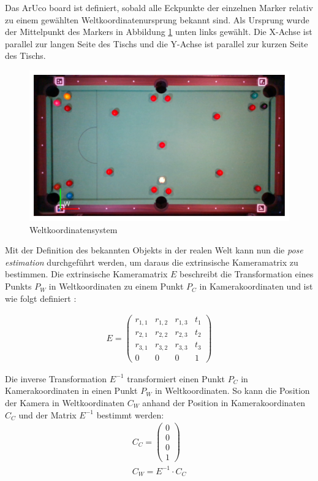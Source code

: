 Das ArUco board ist definiert, sobald alle Eckpunkte der einzelnen Marker relativ zu einem
gewählten Weltkoordinatenursprung bekannt sind. Als Ursprung wurde der Mittelpunkt des Markers
in Abbildung \ref{fig:table_world_coordinate_system} unten links gewählt.
Die X-Achse ist parallel zur langen Seite des Tischs und die Y-Achse ist parallel zur kurzen Seite des Tischs.

\begin{figure}[h!]
    \begin{center}
    \includegraphics[width=0.6\linewidth]{../common/resources/coordinate_systems/table_world_coordinate_system.png}
    \end{center}
    \caption{Weltkoordinatensystem}
    \label{fig:table_world_coordinate_system}
\end{figure}

Mit der Definition des bekannten Objekts in der realen Welt kann nun die \emph{pose estimation} durchgeführt werden,
um daraus die extrinsische Kameramatrix zu bestimmen. Die extrinsische Kameramatrix $E$ beschreibt die Transformation eines
Punkts $P_W$ in Weltkoordinaten zu einem Punkt $P_C$ in Kamerakoordinaten und ist wie folgt definiert \cite{simek:extrinsic_camera_matrix}:

\begin{align}
E =
\begin{pmatrix}
    r_{1,1} & r_{1,2} & r_{1,3} & t_1\\
    r_{2,1} & r_{2,2} & r_{2,3} & t_2\\
    r_{3,1} & r_{3,2} & r_{3,3} & t_3\\
    0       & 0       & 0       & 1
\end{pmatrix}
\end{align}

Die inverse Transformation $E^{-1}$ transformiert einen Punkt $P_C$ in Kamerakoordinaten in einen Punkt $P_W$ in Weltkoordinaten.
So kann die Position der Kamera in Weltkoordinaten $C_W$ anhand der Position in Kamerakoordinaten $C_C$ und der Matrix $E^{-1}$ bestimmt werden:
\begin{align}
C_C = \begin{pmatrix} 0 \\ 0 \\ 0 \\ 1 \end{pmatrix}\\
C_W = E^{-1} \cdot C_C
\end{align}

